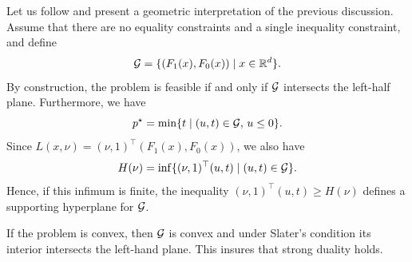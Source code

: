 \documentclass{report}
\begin{document}
Let us follow \cite[Section~5.3]{boydConvex2023} and present a geometric interpretation of the previous discussion.
% 
% 
Assume that there are no equality constraints and a single inequality constraint, and define 
\begin{equation}
	\mathcal{G} = \{ (F_1(x), F_0(x)) \mid x\in \mathbb{R}^d\}.
\end{equation}
By construction, the problem is feasible if and only if $\mathcal{G}$ intersects the left-half plane.
Furthermore, we have
\begin{equation}
	p^\star  = \min\{ t \mid (u,t)\in \mathcal{G},\, u\le 0\}.
\end{equation}
Since $L(x,\nu) = (\nu,1)^\top (F_1(x),F_0(x))$, we also have 
\begin{equation}
	H(\nu) = \inf \{  (\nu,1)^\top (u,t) \mid (u,t)\in \mathcal{G} \}.
\end{equation}
Hence, if this infimum is finite, the inequality $(\nu,1)^\top (u,t)\ge H(\nu)$ defines a supporting hyperplane for $\mathcal{G}$. 

If the problem is convex, then $\mathcal{G}$ is convex and under Slater's condition its interior intersects the left-hand plane. This insures that strong duality holds.
\end{document}
